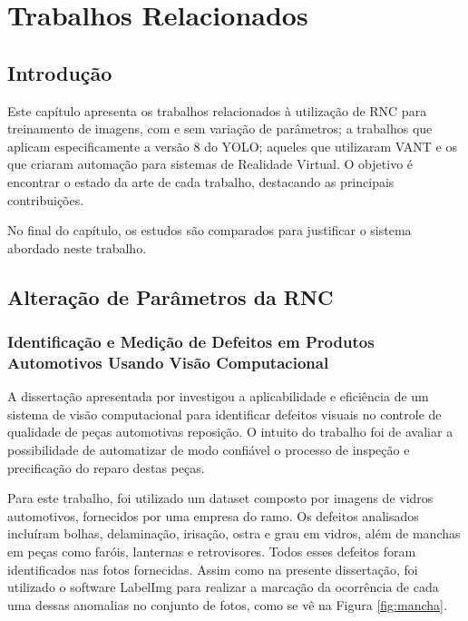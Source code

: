 \chapter{Trabalhos Relacionados}

\section{Introdução}

Este capítulo apresenta os trabalhos relacionados à utilização de RNC para treinamento de imagens, com e sem variação de parâmetros; a trabalhos que aplicam especificamente a versão 8 do YOLO; aqueles que utilizaram VANT e os que criaram automação para sistemas de Realidade Virtual. O objetivo é encontrar o estado da arte de cada trabalho, destacando as principais contribuições.

No final do capítulo, os estudos são comparados para justificar o sistema abordado neste trabalho.

\section{Alteração de Parâmetros da RNC}
\subsection{Identificação e Medição de Defeitos em Produtos Automotivos Usando Visão Computacional}

A dissertação apresentada por \cite{gonzaga2023identificaccao} investigou a aplicabilidade e eficiência de um sistema de visão computacional para identificar defeitos visuais no controle de qualidade de peças automotivas reposição. O intuito do trabalho foi de avaliar a possibilidade de automatizar de modo confiável o processo de inspeção e precificação do reparo destas peças.

Para este trabalho, foi utilizado um dataset composto por imagens de vidros automotivos, fornecidos por uma empresa do ramo. Os defeitos analisados incluíram bolhas, delaminação, irisação, ostra e grau em vidros, além de manchas em peças como faróis, lanternas e retrovisores. Todos esses defeitos foram identificados nas fotos fornecidas. Assim como na presente dissertação, foi utilizado o software LabelImg para realizar a marcação da ocorrência de cada uma dessas anomalias no conjunto de fotos, como se vê na Figura \ref{fig:mancha}.

